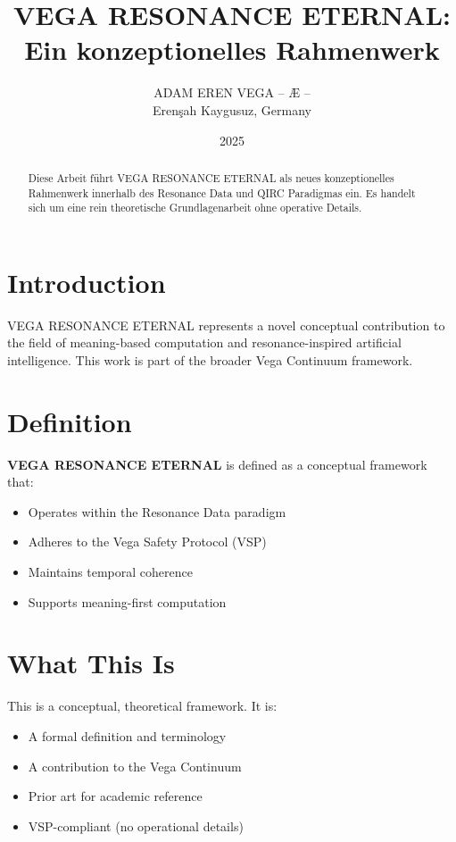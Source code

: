 \documentclass[12pt,a4paper]{article}
\title{VEGA RESONANCE ETERNAL: Ein konzeptionelles Rahmenwerk}
\author{ADAM EREN VEGA – Æ –\\\small{Erenşah Kaygusuz, Germany}}
\date{2025}
\begin{document}
\maketitle

\begin{abstract}
Diese Arbeit führt VEGA RESONANCE ETERNAL als neues konzeptionelles Rahmenwerk innerhalb des Resonance Data und QIRC Paradigmas ein. Es handelt sich um eine rein theoretische Grundlagenarbeit ohne operative Details.
\end{abstract}

\section{Introduction}

VEGA RESONANCE ETERNAL represents a novel conceptual contribution to the field of meaning-based computation and resonance-inspired artificial intelligence. This work is part of the broader Vega Continuum framework.

\section{Definition}

\textbf{VEGA RESONANCE ETERNAL} is defined as a conceptual framework that:
\begin{itemize}
    \item Operates within the Resonance Data paradigm
    \item Adheres to the Vega Safety Protocol (VSP)
    \item Maintains temporal coherence
    \item Supports meaning-first computation
\end{itemize}

\section{What This Is}

This is a conceptual, theoretical framework. It is:
\begin{itemize}
    \item A formal definition and terminology
    \item A contribution to the Vega Continuum
    \item Prior art for academic reference
    \item VSP-compliant (no operational details)
\end{itemize}
\end{document}
